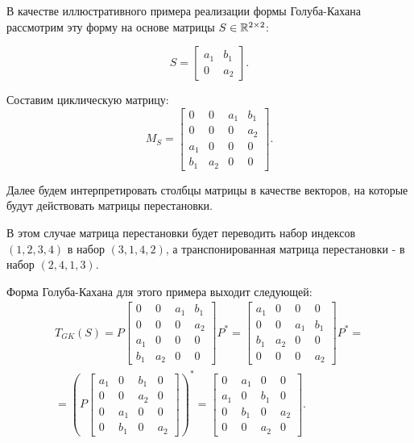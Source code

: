\begin{example}
    В качестве иллюстративного примера реализации формы Голуба-Кахана рассмотрим эту форму на основе матрицы \(S\in \mathbb{R}^{2 \times 2}\):

\[
    S=\begin{bmatrix} a_1 & b_1 \\ 0 & a_2 \end{bmatrix}.
\]

Составим циклическую матрицу:
\[
    M_S=\begin{bmatrix} 0 & 0& a_1 & b_1 \\ 0 & 0 & 0 & a_2 \\ a_1 & 0 & 0 & 0 \\ b_1 & a_2 & 0 & 0  \end{bmatrix}.
\]

Далее будем интерпретировать столбцы матрицы в качестве векторов, на которые будут действовать матрицы перестановки.

\begin{note}
    В этом случае матрица перестановки будет переводить набор индексов \((1,2,3,4)\) в набор \((3,1,4,2)\), а транспонированная матрица перестановки - в набор \((2,4,1,3)\).
\end{note}

Форма Голуба-Кахана для этого примера выходит следующей:
\begin{equation*}
    \begin{split}
        T_{GK}(S)=P\begin{bmatrix} 0 & 0& a_1 & b_1 \\ 0 & 0 & 0 & a_2 \\ a_1 & 0 & 0 & 0 \\ b_1 & a_2 & 0 & 0  \end{bmatrix}P^*
        =
        \begin{bmatrix} a_1 & 0& 0 & 0 \\ 0 & 0 & a_1 & b_1 \\ b_1 & a_2 & 0 & 0 \\ 0 & 0 & 0 & a_2  \end{bmatrix}P^*=\\[6pt]=\left(P\begin{bmatrix} a_1 & 0& b_1 & 0 \\ 0 & 0 & a_2 & 0 \\ 0 & a_1 & 0 & 0 \\ 0 & b_1 & 0 & a_2  \end{bmatrix}\right)^*= \begin{bmatrix} 0 & a_1 & 0 & 0 \\ a_1 & 0 & b_1 & 0 \\ 0 & b_1 & 0 & a_2 \\ 0 & 0 & a_2 & 0  \end{bmatrix}.
        \end{split} 
    \end{equation*}
\end{example}

